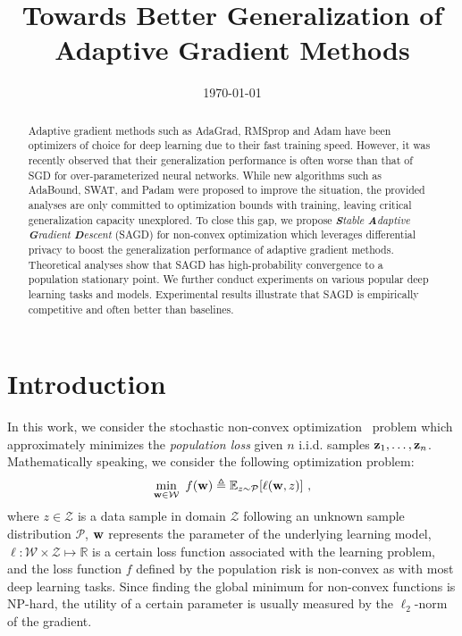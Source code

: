 \documentclass[11pt]{article}
\begin{document}
\title{Towards Better Generalization of Adaptive Gradient Methods}
\date{\today}

\maketitle


\begin{abstract}
Adaptive gradient methods such as AdaGrad, RMSprop and Adam have been optimizers of choice for deep learning due to their fast training speed. However, it was recently observed that their generalization performance is often worse than that of SGD for over-parameterized neural networks. While new algorithms such as AdaBound, SWAT, and Padam were proposed to improve the situation, the provided analyses are only committed to optimization bounds with training, leaving critical generalization capacity unexplored. To close this gap, we propose \textit{\textbf{S}table \textbf{A}daptive \textbf{G}radient \textbf{D}escent} (SAGD) for non-convex optimization which leverages differential privacy to boost the generalization performance of adaptive gradient methods. Theoretical analyses show that SAGD has high-probability convergence to a population stationary point. We further conduct experiments on various popular deep learning tasks and models. Experimental results illustrate that SAGD is empirically competitive and often better than baselines. 
\end{abstract}

\section{Introduction}

In this work, we consider the stochastic non-convex optimization~\cite{zare18} problem which approximately minimizes the \emph{population loss} given $n $ i.i.d. samples $\mathbf{z}_{1}, \dots, \mathbf{z}_{n}$. Mathematically speaking, we consider the following optimization problem:
\begin{equation} \label{eq: problem}
 \min_{\w \in \cW}~ f({\w})
 \triangleq {\mathbb{E}_{z \sim \mathcal{P}}}[\ell(\w,z)]~,
\end{equation}
where $z\in \mathcal{Z}$ is a data sample in domain $\mathcal{Z}$ following an unknown sample distribution $\mathcal{P}$, ${\mathbf{w}}$ represents the parameter of the underlying learning model, $\ell:\mathcal{W}\times \mathcal{Z}\mapsto \mathbb{R} $ is a certain loss function associated with the learning problem, and the loss function $f$ defined by the population risk is non-convex as with most deep learning tasks. Since  finding the global minimum for non-convex functions
is NP-hard, the utility of a certain parameter is usually measured by the $\ell_2$-norm of the gradient. 
\end{document}
